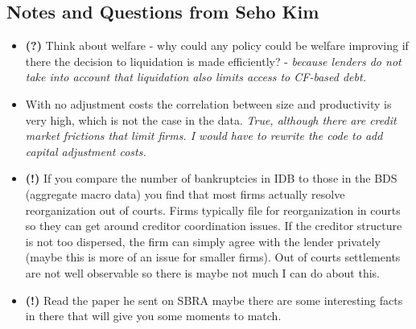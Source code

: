 \documentclass[12pt]{article}
\begin{document}
\subsection*{Notes and Questions from Seho Kim}
\begin{itemize} \setlength\itemsep{0em}  \small
    \item \textbf{(?)} Think about welfare - why could any policy could be welfare improving if there the decision to liquidation is made efficiently? - \textit{because lenders do not take into account that liquidation also limits access to CF-based debt.}
    \item With no adjustment costs the correlation between size and productivity is very high, which is not the case in the data. \textit{True, although there are credit market frictions that limit firms.  I would have to rewrite the code to add capital adjustment costs. }
    \item  \textbf{(!)} If you compare the number of bankruptcies in IDB to those in the BDS (aggregate macro data) you find that most firms actually resolve reorganization out of courts. Firms typically file for reorganization in courts so they can get around creditor coordination issues. If the creditor structure is not too dispersed, the firm can simply agree with the lender privately (maybe this is more of an issue for smaller firms). Out of courts settlements are not well observable so there is maybe not much I can do about this.
    \item \textbf{(!)} Read the paper he sent on SBRA maybe there are some interesting facts in there that will give you some moments to match.
\end{itemize} \normalsize
\end{document}
